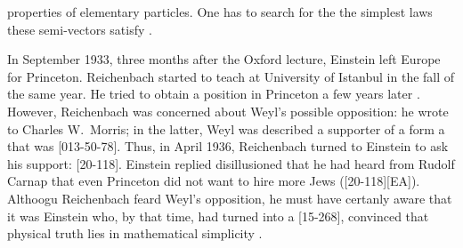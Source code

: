 \documentclass[draft]{article}
\begin{document}
properties of elementary particles. One has to search for the the simplest laws these semi-vectors satisfy \citep[168]{Einstein1933}.

In September 1933, three months after the Oxford lecture, Einstein left Europe for Princeton. Reichenbach started to teach at University of Istanbul in the fall of the same year. He tried to obtain a position in Princeton a few years later \citep{Verhaegh2020a}. However, Reichenbach was concerned about Weyl's possible opposition:  he wrote to Charles W.\ Morris; in the latter, Weyl was described a supporter of a form a  that was  [013-50-78].  Thus, in April 1936, Reichenbach turned to Einstein to ask his support:  [20-118]. Einstein replied disillusioned that he had heard from Rudolf Carnap that even Princeton did not want to hire more Jews ([20-118][EA]). Althoogu Reichenbach feard Weyl's opposition, he must have certanly aware that it was Einstein who, by that time, had turned into a  [15-268], convinced that physical truth lies in mathematical simplicity \citep{Ryckman2014}.  





\end{document}
